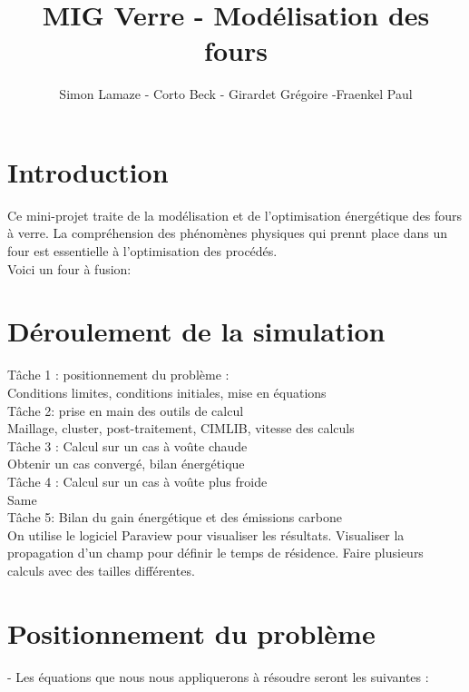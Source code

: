 \documentclass[12pt, a4paper, french, BCOR = 0pt, DIV = 10]{scrartcl}
\title{MIG Verre - Modélisation des fours}
\author{\small{Simon Lamaze - Corto Beck - Girardet Grégoire -Fraenkel Paul}}
\begin{document}
	
	\maketitle
	
	\section{Introduction}
	\raggedright
	Ce mini-projet traite de la modélisation et de l'optimisation énergétique des fours à verre.  La compréhension des phénomènes physiques qui prennt place dans un four est essentielle à l'optimisation des procédés. \\ [0.5 cm]
	Voici un four à fusion:
	

	
	
	
	
	\section{ Déroulement de la simulation}
	\raggedright
	Tâche 1 : positionnement du problème : \\
	Conditions limites, conditions initiales, mise en équations \\[0.3 cm]
	Tâche 2: prise en main des outils de calcul\\
	Maillage, cluster, post-traitement, CIMLIB, vitesse des calculs \\ [0.3 cm]
	
	Tâche 3 : Calcul sur un cas à voûte chaude\\ 
	Obtenir un cas convergé, bilan énergétique \\ [0.3 cm]
	
	Tâche 4 : Calcul sur un cas à voûte plus froide \\ 
	Same\\ [0.3 cm]
	
	Tâche 5: Bilan du gain énergétique et des émissions carbone \\ [0.5cm]
	
	
	On  utilise le logiciel Paraview pour visualiser les résultats.
	Visualiser la propagation d'un champ pour définir le temps de résidence.
	Faire plusieurs calculs avec des tailles différentes.
	
	\section{Positionnement du problème}
	- Les équations que nous nous appliquerons à résoudre seront les suivantes : \\
\end{document}
